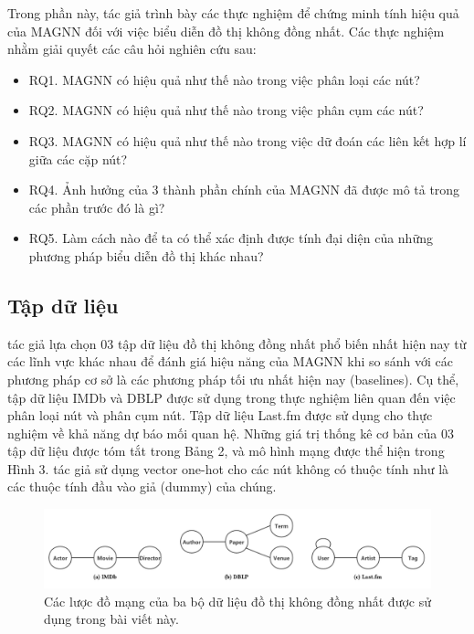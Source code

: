 Trong phần này, tác giả trình bày các thực nghiệm để chứng minh tính hiệu quả của MAGNN đối với việc biểu diễn đồ thị không đồng nhất. Các thực nghiệm nhằm giải quyết các câu hỏi nghiên cứu sau:

\begin{itemize}
  \item RQ1. MAGNN có hiệu quả như thế nào trong việc phân loại các nút?
  \item RQ2. MAGNN có hiệu quả như thế nào trong việc phân cụm các nút?
  \item RQ3. MAGNN có hiệu quả như thế nào trong việc dữ đoán các liên kết hợp lí giữa các cặp nút?
  \item RQ4. Ảnh hưởng của 3 thành phần chính của MAGNN đã được mô tả trong các phần trước đó là gì?
  \item RQ5. Làm cách nào để ta có thể xác định được tính đại diện của những phương pháp biểu diễn đồ thị khác nhau?
\end{itemize}

\subsection{Tập dữ liệu}
tác giả lựa chọn 03 tập dữ liệu đồ thị không đồng nhất phổ biến nhất hiện nay từ các lĩnh vực khác nhau để đánh giá hiệu năng của MAGNN khi so sánh với các phương pháp cơ sở là các phương pháp tối ưu nhất hiện nay (baselines). Cụ thể, tập dữ liệu IMDb và DBLP được sử dụng trong thực nghiệm liên quan đến việc phân loại nút và phân cụm nút. Tập dữ liệu Last.fm được sử dụng cho thực nghiệm về khả năng dự báo mối quan hệ. Những giá trị thống kê cơ bản của 03 tập dữ liệu được tóm tắt trong Bảng 2, và mô hình mạng được thể hiện trong Hình 3. tác giả sử dụng vector one-hot cho các nút không có thuộc tính như là các thuộc tính đầu vào giả (dummy) của chúng. 

\begin{figure}
  \includegraphics[width=\textwidth]{figs/fig3.png}
  \caption{Các lược đồ mạng của ba bộ dữ liệu đồ thị không đồng nhất được sử dụng trong bài viết này.}
\end{figure}

